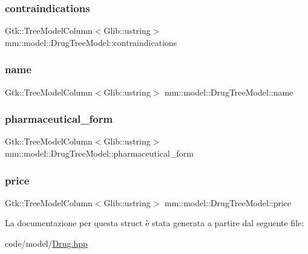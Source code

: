 \subsubsection{\texorpdfstring{contraindications}{contraindications}}
{\footnotesize\ttfamily Gtk\+::\+Tree\+Model\+Column$<$Glib\+::ustring$>$ mm\+::model\+::\+Drug\+Tree\+Model\+::contraindications}

\mbox{\label{structmm_1_1model_1_1_drug_tree_model_aae1c93a96cd321861445996965814405}} 
\subsubsection{\texorpdfstring{name}{name}}
{\footnotesize\ttfamily Gtk\+::\+Tree\+Model\+Column$<$Glib\+::ustring$>$ mm\+::model\+::\+Drug\+Tree\+Model\+::name}

\mbox{\label{structmm_1_1model_1_1_drug_tree_model_aa93ee13951feb310e5b31775ebf74609}} 
\subsubsection{\texorpdfstring{pharmaceutical\+\_\+form}{pharmaceutical\_form}}
{\footnotesize\ttfamily Gtk\+::\+Tree\+Model\+Column$<$Glib\+::ustring$>$ mm\+::model\+::\+Drug\+Tree\+Model\+::pharmaceutical\+\_\+form}

\mbox{\label{structmm_1_1model_1_1_drug_tree_model_a19f5c8676ecd88d4bb8b6f5d161d8a6b}} 
\subsubsection{\texorpdfstring{price}{price}}
{\footnotesize\ttfamily Gtk\+::\+Tree\+Model\+Column$<$Glib\+::ustring$>$ mm\+::model\+::\+Drug\+Tree\+Model\+::price}



La documentazione per questa struct è stata generata a partire dal seguente file\+:\begin{DoxyCompactItemize}
\item 
code/model/\mbox{\hyperlink{_drug_8hpp}{Drug.\+hpp}}\end{DoxyCompactItemize}
